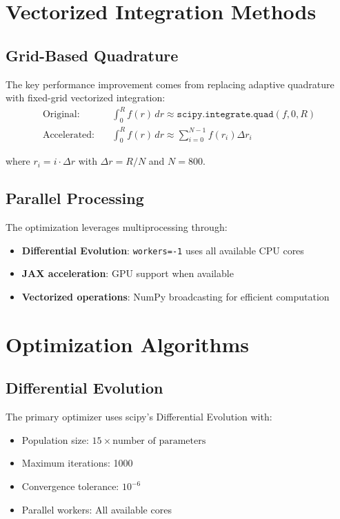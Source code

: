 \documentclass[12pt]{article}
\begin{document}
\section{Vectorized Integration Methods}

\subsection{Grid-Based Quadrature}

The key performance improvement comes from replacing adaptive quadrature with fixed-grid vectorized integration:
\begin{align}
\text{Original:} \quad & \int_0^R f(r) \, dr \approx \texttt{scipy.integrate.quad}(f, 0, R) \\
\text{Accelerated:} \quad & \int_0^R f(r) \, dr \approx \sum_{i=0}^{N-1} f(r_i) \Delta r_i
\end{align}

where \(r_i = i \cdot \Delta r\) with \(\Delta r = R/N\) and \(N = 800\).

\subsection{Parallel Processing}

The optimization leverages multiprocessing through:
\begin{itemize}
\item \textbf{Differential Evolution}: \texttt{workers=-1} uses all available CPU cores
\item \textbf{JAX acceleration}: GPU support when available
\item \textbf{Vectorized operations}: NumPy broadcasting for efficient computation
\end{itemize}

\section{Optimization Algorithms}

\subsection{Differential Evolution}

The primary optimizer uses scipy's Differential Evolution with:
\begin{itemize}
\item Population size: \(15 \times \text{number of parameters}\)
\item Maximum iterations: 1000
\item Convergence tolerance: \(10^{-6}\)
\item Parallel workers: All available cores
\end{itemize}
\end{document}
